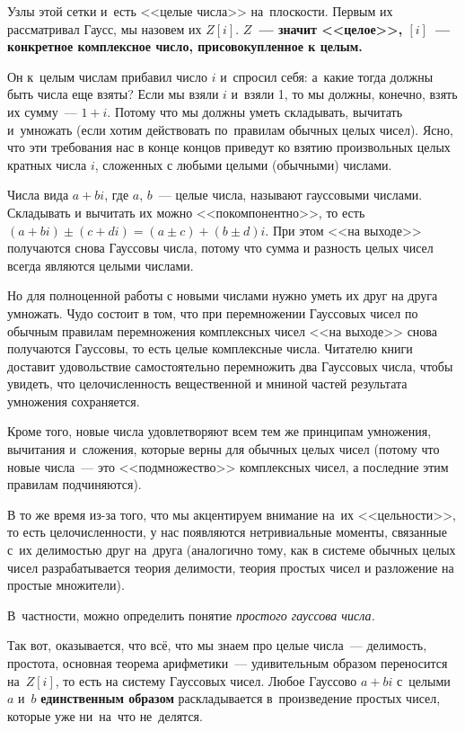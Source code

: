 Узлы этой сетки и~есть <<целые числа>> на~плоскости. Первым их рассматривал Гаусс, мы назовем их
$Z[i]$. \textbf{$Z$~--- значит <<целое>>, $[i]$~--- конкретное комплексное число, присовокупленное к целым.}

Он к~целым числам прибавил число $i$ и~спросил себя: а~какие тогда должны быть числа еще взяты? Если
мы взяли $i$ и~взяли 1, то мы должны, конечно, взять их сумму~--- $1+i$. Потому что мы должны уметь
складывать, вычитать и~умножать (если хотим действовать по~правилам обычных целых чисел). Ясно, что
эти требования нас в конце концов приведут ко взятию произвольных целых кратных числа $i$, сложенных
с любыми целыми (обычными) числами.

\pagebreak

Числа вида $a+bi$, где $a$, $b$~--- целые числа, называют гауссовыми числами. Складывать и вычитать
их можно <<покомпонентно>>, то есть $(a+bi) \pm (c+di) = (a \pm c) + (b \pm d)i$. При этом <<на выходе>>
получаются снова Гауссовы числа, потому что сумма и разность целых чисел всегда являются целыми числами.

Но для полноценной работы с новыми числами нужно уметь их друг на друга умножать. Чудо состоит в том,
что при перемножении Гауссовых чисел по обычным правилам перемножения комплексных чисел <<на выходе>>
снова получаются Гауссовы, то есть целые комплексные числа. Читателю книги доставит удовольствие
самостоятельно перемножить два Гауссовых числа, чтобы увидеть, что целочисленность вещественной и
мниной частей результата умножения сохраняется.

Кроме того, новые числа удовлетворяют всем тем же принципам умножения, вычитания и~сложения, которые
верны для обычных целых чисел (потому что новые числа~--- это <<подмножество>> комплексных чисел, а
последние этим правилам подчиняются).

В то же время из-за того, что мы акцентируем внимание на~их <<цельности>>, то есть целочисленности,
у нас появляются нетривиальные моменты, связанные с~их делимостью друг на~друга (аналогично тому, как
в системе обычных целых чисел разрабатывается теория делимости, теория простых чисел и разложение на простые
множители).


В~частности, можно определить понятие \textit{простого гауссова числа.}

Так вот, оказывается, что всё, что мы знаем про целые числа~--- делимость, простота, основная теорема
арифметики~--- удивительным образом переносится на~$Z[i]$, то есть на систему Гауссовых чисел. Любое
Гауссово $a+bi$ с~целыми $a$ и~$b$ \textbf{единственным образом} раскладывается в~произведение простых
чисел, которые уже ни~на~что не~делятся.

